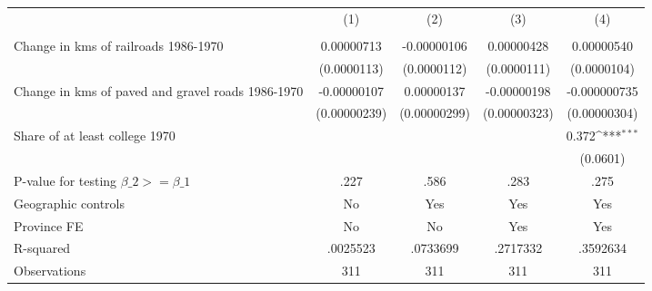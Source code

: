{
\def\sym#1{\ifmmode^{#1}\else\(^{#1}\)\fi}
\begin{tabular}{l*{4}{c}}
\hline\hline
                &\multicolumn{1}{c}{(1)}&\multicolumn{1}{c}{(2)}&\multicolumn{1}{c}{(3)}&\multicolumn{1}{c}{(4)}\\
                &\multicolumn{1}{c}{}&\multicolumn{1}{c}{}&\multicolumn{1}{c}{}&\multicolumn{1}{c}{}\\
\hline
Change in kms of railroads 1986-1970&0.00000713         &-0.00000106         &0.00000428         &0.00000540         \\
                &(0.0000113)         &(0.0000112)         &(0.0000111)         &(0.0000104)         \\
[1em]
Change in kms of paved and gravel roads 1986-1970&-0.00000107         &0.00000137         &-0.00000198         &-0.000000735         \\
                &(0.00000239)         &(0.00000299)         &(0.00000323)         &(0.00000304)         \\
[1em]
Share of at least college 1970&                  &                  &                  &    0.372\sym{***}\\
                &                  &                  &                  & (0.0601)         \\
\hline
P-value for testing $\beta\_{2} >= \beta\_{1}$&     .227         &     .586         &     .283         &     .275         \\
Geographic controls&       No         &      Yes         &      Yes         &      Yes         \\
Province FE     &       No         &       No         &      Yes         &      Yes         \\
R-squared       & .0025523         & .0733699         & .2717332         & .3592634         \\
Observations    &      311         &      311         &      311         &      311         \\
\hline\hline
\end{tabular}
}

